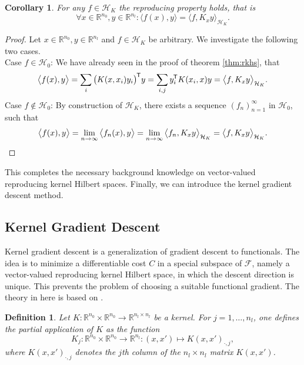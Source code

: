\documentclass[11pt, a4paper]{article}
\newtheorem{corollary}[theorem]{Corollary}
\newtheorem{definition}[theorem]{Definition}
\newcommand{\R}{\mathbb{R}}
\newcommand{\F}{\mathcal{F}}
\renewcommand{\H}{\mathcal{H}}
\newcommand*{\tr}{^{\mkern-1.5mu\mathsf{T}}}
\begin{document}
\begin{corollary}
For any $f \in \H_K$ the reproducing property holds, that is
\[ \forall x \in \R^{n_0}, y \in \R^{n_l} : \big \langle f(x), y \big \rangle = \big \langle f, K_xy \big \rangle_{\H_K}. \]
\end{corollary}

\begin{proof}
Let $x \in \R^{n_0}, y \in \R^{n_l}$ and $f \in \H_K$ be arbitrary. We investigate the following two cases. \\

Case $f \in \H_0$: We have already seen in the proof of theorem \ref{thm:rkhs}, that
\[ \big \langle f(x), y \big \rangle = \sum_{i} \big ( K(x,x_i)y_i \big ) \tr y = \sum_{i,j} y_i \tr K(x_i,x)y = \big \langle f, K_xy \big \rangle_{\H_K}. \]
Case $f \notin \H_0$: By construction of $\H_K$, there exists a sequence $(f_n)_{n=1}^{\infty}$ in $\H_0$, such that
\[ \big \langle f(x),y \big \rangle = \lim_{n \to \infty} \big \langle f_n(x),y \big \rangle = \lim_{n \to \infty} \big \langle f_n, K_xy \big \rangle_{\H_K} = \big \langle f, K_xy \big \rangle_{\H_K}. \qedhere \]
\end{proof}

This completes the necessary background knowledge on vector-valued reproducing kernel Hilbert spaces. Finally, we can introduce the kernel gradient descent method.

\subsection{Kernel Gradient Descent} \label{sec:KGD}

Kernel gradient descent is a generalization of gradient descent to functionals. The idea is to minimize a differentiable cost $C$ in a special subspace of $\F$, namely a vector-valued reproducing kernel Hilbert space, in which the descent direction is unique. This prevents the problem of choosing a suitable functional gradient.
The theory in here is based on \cite{NTK}.

\begin{definition}
Let $K: \R^{n_0} \times \R^{n_0} \to \R^{n_l \times n_l}$ be a kernel. For $j=1, \dots, n_l$, one defines the partial application of $K$ as the function
\[ K_j : \R^{n_0} \times \R^{n_0} \to \R^{n_l} : (x,x') \mapsto K(x,x')_{\cdot,j}, \]
where $K(x,x')_{\cdot,j}$ denotes the $j$th column of the $n_l \times n_l$ matrix $K(x,x')$.
\end{definition}
\end{document}
